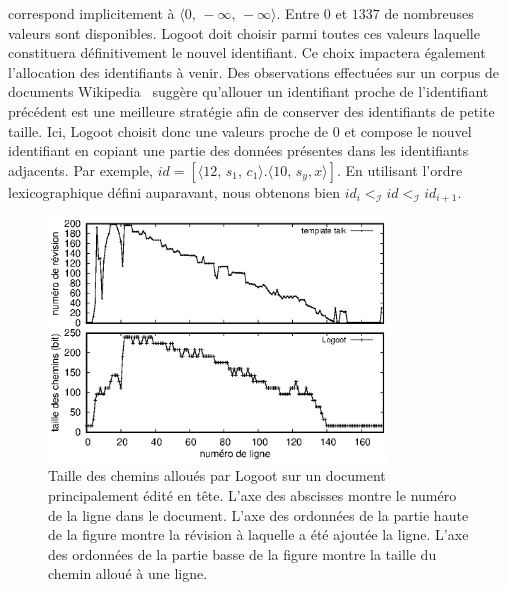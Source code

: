 correspond implicitement à $\langle 0,\, -\infty ,\, -\infty \rangle$.  Entre
$0$ et $1337$ de nombreuses valeurs sont disponibles.  Logoot doit choisir parmi
toutes ces valeurs laquelle constituera définitivement le nouvel identifiant. Ce
choix impactera également l'allocation des identifiants à venir.
Des observations effectuées sur un corpus de documents
Wikipedia~\cite{wikipedia} suggère qu'allouer un identifiant proche de
l'identifiant précédent est une meilleure stratégie afin de conserver des
identifiants de petite taille.  Ici, Logoot choisit donc une valeurs proche de
$0$ et compose le nouvel identifiant en copiant une partie des données présentes
dans les identifiants adjacents. Par exemple,
$id = [\langle 12,\, s_1,\,c_1 \rangle.\langle 10,\,s_y, x\rangle]$.  En
utilisant l'ordre lexicographique défini auparavant, nous obtenons bien
$id_{i} <_\mathcal{I} id <_\mathcal{I} id_{i+1}$.

\begin{figure}
  \begin{center}
    \includegraphics[width=0.8\textwidth]{img/lseq/motivationlogoot.eps}
    \caption[Taille des chemins alloués par Logoot sur un document édité en
    tête]{\label{repl:img:motivationlogoot} Taille des chemins alloués par
      Logoot sur un document principalement édité en tête. L'axe des abscisses
      montre le numéro de la ligne dans le document. L'axe des ordonnées de la
      partie haute de la figure montre la révision à laquelle a été ajoutée la
      ligne. L'axe des ordonnées de la partie basse de la figure montre la taille
      du chemin alloué à une ligne.}
  \end{center}
\end{figure}

